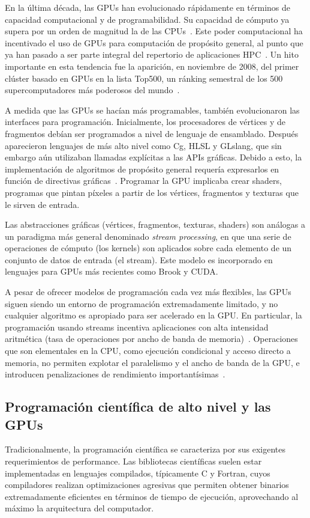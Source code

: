 \documentclass[11pt,spanish]{article}
\begin{document}
En la última década, las GPUs han evolucionado rápidamente en términos de
capacidad computacional y de programabilidad.  Su capacidad de cómputo ya supera
por un orden de magnitud la de las CPUs~\cite{gpupp}.  Este poder computacional ha
incentivado el uso de GPUs para computación de propósito general, al punto que
ya han pasado a ser parte integral del repertorio de aplicaciones
HPC~\cite{gpu-computing}.
Un hito importante en esta tendencia fue la aparición, en noviembre de 2008, del
primer clúster basado en GPUs en la lista Top500, un ránking semestral de los
500 supercomputadores más poderosos del mundo~\cite{top500}.

A medida que las GPUs se hacían más programables, también evolucionaron las
interfaces para programación.  Inicialmente, los procesadores de
vértices y de fragmentos debían ser programados a nivel de lenguaje de
ensamblado.
Después aparecieron lenguajes de más alto nivel como Cg, HLSL y GLslang,
que sin embargo aún utilizaban llamadas explícitas a las APIs gráficas.
Debido a esto, la implementación de algoritmos de propósito general
requería expresarlos en función de directivas gráficas~\cite[\S2.2]{brookgpu}.
Programar la GPU implicaba crear shaders, programas que pintan píxeles a partir
de los vértices, fragmentos y texturas que le sirven de entrada.

Las abstracciones gráficas (vértices, fragmentos, texturas, shaders)
son análogas a un paradigma más general denominado \emph{stream processing},
en que una serie de operaciones de cómputo (los kernels) son aplicados sobre
cada elemento de un conjunto de datos de entrada (el stream).  Este modelo es
incorporado en lenguajes para GPUs más recientes como Brook y CUDA.

A pesar de ofrecer modelos de programación cada vez más flexibles,
las GPUs siguen siendo un entorno de programación extremadamente limitado,
y no cualquier algoritmo es apropiado para ser acelerado en la GPU.
En particular, la programación usando streams
incentiva aplicaciones con alta intensidad aritmética
(tasa de operaciones por ancho de banda de memoria)~\cite[\S2.1]{brookgpu}.
Operaciones que son elementales en la CPU, como
ejecución condicional y acceso directo a memoria, no permiten explotar el
paralelismo y el ancho de banda de la GPU, e introducen penalizaciones de
rendimiento importantísimas~\cite[\S{}V.C]{gpu-computing}.

\subsection{Programación científica de alto nivel y las GPUs}
Tradicionalmente, la programación científica se caracteriza por sus
exigentes requerimientos de performance.  Las bibliotecas científicas suelen
estar implementadas en lenguajes compilados, típicamente C y Fortran, cuyos
compiladores realizan optimizaciones agresivas que permiten obtener binarios
extremadamente eficientes en términos de tiempo de ejecución, aprovechando al
máximo la arquitectura del computador.
\end{document}

